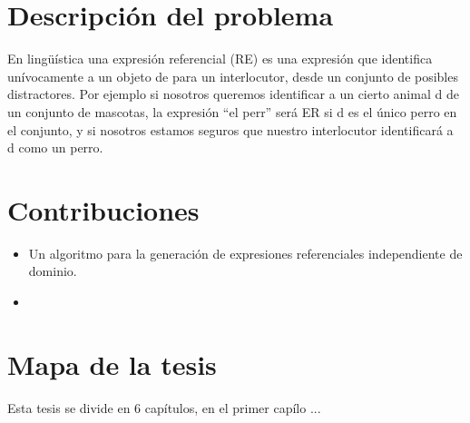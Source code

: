 \section{Descripci\'on del problema}
\label{sec:intro}

En ling\"u\'{i}stica una expresi\'on referencial (RE) es una expresi\'on que identifica un\'{i}vocamente a un objeto de para un interlocutor, desde un conjunto de posibles distractores. Por ejemplo si nosotros queremos identificar a un cierto animal d de un conjunto de mascotas, la expresi\'on ``el perr'' ser\'a ER si d es el \'unico perro en el conjunto, y si nosotros estamos seguros que nuestro interlocutor identificar\'a a d como un perro.


\section{Contribuciones}

\begin{itemize}
 \item Un algoritmo para la generaci\'on de expresiones referenciales independiente de dominio.
 \item
\end{itemize}

\section{Mapa de la tesis}
Esta tesis se divide en 6 cap\'{i}tulos, en el primer cap\'{i}lo ...

